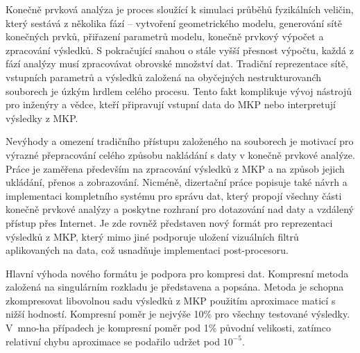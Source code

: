 \documentclass[
11pt, %
english, %
singlespacing, %
headsepline, %
]{MastersDoctoralThesis} %
\begin{document}
\begin{abstractcs}
\addchaptertocentry{\abstractnamecs} %
  
Kone\v{c}n\v{e} prvkov\'a anal\'yza je proces slou\v{z}\'ic\'i k simulaci pr\r{u}b\v{e}h\r{u} fyzik\'aln\'ich veli\v{c}in, kter\'y sest\'av\'a z n\v{e}kolika f\'az\'i -- vytvo\v{r}en\'i geometrick\'eho modelu, generov\'an\'i s\'it\v{e} kone\v{c}n\'ych prvk\r{u}, p\v{r}i\v{r}azen\'i parametr\r{u} modelu, kone\v{c}n\v{e} prvkov\'y v\'ypo\v{c}et a zpracov\'an\'i v\'ysledk\r{u}. S pokra\v{c}uj\'ic\'i snahou o st\'ale vy\v{s}\v{s}\'i p\v{r}esnost v\'ypo\v{c}tu, ka\v{z}d\'a z f\'az\'i anal\'yzy mus\'i zpracov\'avat obrovsk\'e mno\v{z}stv\'i dat. Tradi\v{c}n\'i reprezentace s\'it\v{e}, vstupn\'ich parametr\r{u} a v\'ysledk\r{u} zalo\v{z}en\'a na oby\v{c}ejn\'ych nestrukturovan\'ch souborech je \'uzk\'ym hrdlem cel\'eho procesu. Tento fakt komplikuje v\'yvoj n\'astroj\r{u} pro in\v{z}en\'yry a v\v{e}dce, kte\v{r}\'i p\v{r}ipravuj\'i vstupn\'i data do MKP nebo interpretuj\'i v\'ysledky z MKP.

Nev\'yhody a omezen\'i tradi\v{c}n\'iho p\v{r}\'istupu zalo\v{z}en\'eho na souborech je motivac\'i pro v\'yrazn\'e p\v{r}epracov\'an\'i cel\'eho zp\r{u}sobu nakl\'ad\'an\'i s daty v kone\v{c}n\v{e} prvkov\'e anal\'yze. Pr\'ace je zam\v{e}\v{r}ena p\v{r}edev\v{s}\'im na zpracov\'an\'i v\'ysledk\r{u} z MKP a na zp\r{u}sob jejich ukl\'ad\'an\'i, p\v{r}enos a zobrazov\'an\'i. Nicm\'en\v{e}, dizerta\v{c}n\'i pr\'ace popisuje tak\'e n\'avrh a implementaci kompletn\'iho syst\'emu pro spr\'avu dat, kter\'y propoj\'i v\v{s}echny \v{c}\'asti kone\v{c}n\v{e} prvkov\'e anal\'yzy a poskytne rozhran\'i pro dotazov\'an\'i nad daty a vzd\'alen\'y p\v{r}\'istup p\v{r}es Internet. Je zde rovn\v{e}\v{z} p\v{r}edstaven nov\'y form\'at pro reprezentaci v\'ysled\-k\r{u} z MKP, kter\'y mimo jin\'e podporuje ulo\v{z}en\'i vizu\'aln\'ich filtr\r{u} aplikovan\'ych na data, co\v{z} usnad\v{n}uje implementaci post-procesoru.

Hlavn\'i v\'yhoda nov\'eho form\'atu je podpora pro kompresi dat. Kompresn\'i metoda zalo\v{z}en\'a na singul\'arn\'im rozkladu je p\v{r}edstavena a pops\'ana. Metoda je schopna zkompresovat libovolnou sadu v\'ysledk\r{u} z MKP pou\v{z}it\'im aproximace matic\'i s ni\v{z}\v{s}\'i hodnost\'i. Kompresn\'i pom\v{e}r je nejv\'y\v{s}e 10\% pro v\v{s}echny testovan\'e v\'ysledky. V~mno-ha p\v{r}\'ipadech je kompresn\'i pom\v{e}r pod 1\% p\r{u}vodn\'i velikosti, zat\'imco relativn\'i chybu aproximace se poda\v{r}ilo udr\v{z}et pod $10^{-5}$.


\end{abstractcs}
\end{document}
